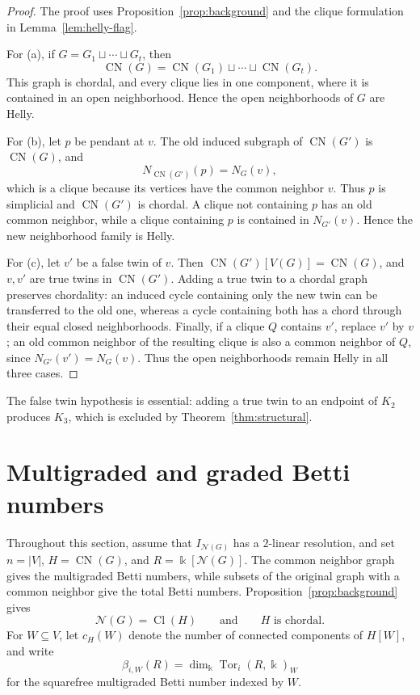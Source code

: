 \documentclass[10pt,a4paper]{amsart}
\numberwithin{equation}{section}
\newcommand{\NN}{\mathcal N}
\newcommand{\Cl}{\operatorname{Cl}}
\newcommand{\CN}{\operatorname{CN}}
\begin{document}
	\begin{proof}
		The proof uses Proposition~\ref{prop:background} and the clique formulation
		in Lemma~\ref{lem:helly-flag}.

		For \textup{(a)}, if \(G=G_1\sqcup\cdots\sqcup G_t\), then
		\[
		\CN(G)=\CN(G_1)\sqcup\cdots\sqcup\CN(G_t).
		\]
		This graph is chordal, and every clique lies in one component, where it is
		contained in an open neighborhood. Hence the open neighborhoods of \(G\)
		are Helly.

		For \textup{(b)}, let \(p\) be pendant at \(v\). The old induced subgraph
		of \(\CN(G')\) is \(\CN(G)\), and
		\[
		N_{\CN(G')}(p)=N_G(v),
		\]
		which is a clique because its vertices have the common neighbor \(v\).
		Thus \(p\) is simplicial and \(\CN(G')\) is chordal. A clique not
		containing \(p\) has an old common neighbor, while a clique containing
		\(p\) is contained in \(N_{G'}(v)\). Hence the new neighborhood family is
		Helly.

		For \textup{(c)}, let \(v'\) be a false twin of \(v\). Then
		\(\CN(G')[V(G)]=\CN(G)\), and \(v,v'\) are true twins in
		\(\CN(G')\). Adding a true twin to a chordal graph preserves chordality:
		an induced cycle containing only the new twin can be transferred to the old
		one, whereas a cycle containing both has a chord through their equal closed
		neighborhoods. Finally, if a clique \(Q\) contains \(v'\), replace \(v'\)
		by \(v\); an old common neighbor of the resulting clique is also a common
		neighbor of \(Q\), since \(N_{G'}(v')=N_G(v)\). Thus the open
		neighborhoods remain Helly in all three cases.
	\end{proof}
	
	The false twin hypothesis is essential: adding a true twin to an endpoint of
	\(K_2\) produces \(K_3\), which is excluded by
	Theorem~\ref{thm:structural}.
	
	\section{Multigraded and graded Betti numbers}\label{sec:betti}
	
	Throughout this section, assume that \(I_{\NN(G)}\) has a \(2\)-linear
	resolution, and set \(n=|V|\), \(H=\CN(G)\), and
	\(R=\Bbbk[\NN(G)]\). The common neighbor graph gives the multigraded
	Betti numbers, while subsets of the original graph with a common neighbor give
	the total Betti numbers.
	Proposition~\ref{prop:background} gives
	\[
	\NN(G)=\Cl(H)\qquad\text{and}\qquad H\text{ is chordal}.
	\]
	For \(W\subseteq V\), let \(c_H(W)\) denote the number of connected
	components of \(H[W]\), and write
	\[
	\beta_{i,W}(R)
	=
	\dim_{\Bbbk}\operatorname{Tor}_i(R,\Bbbk)_W
	\]
	for the squarefree multigraded Betti number indexed by \(W\).
\end{document}
